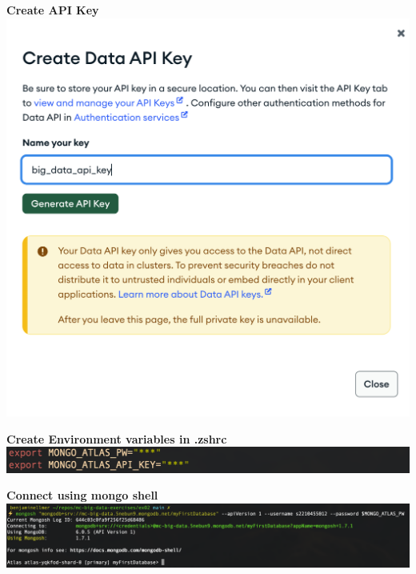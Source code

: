 \documentclass[14pt,a4paper]{extarticle}
\begin{document}
	\noindent \textbf{Create API Key} \\
	\includegraphics[width=\textwidth]{images/sc04.png}

	\noindent \textbf{Create Environment variables in .zshrc} \\
	\includegraphics[width=\textwidth]{images/sc05.png}

	\newpage

	\noindent \textbf{Connect using mongo shell} \\
	\includegraphics[width=\textwidth]{images/sc06.png}
\end{document}

